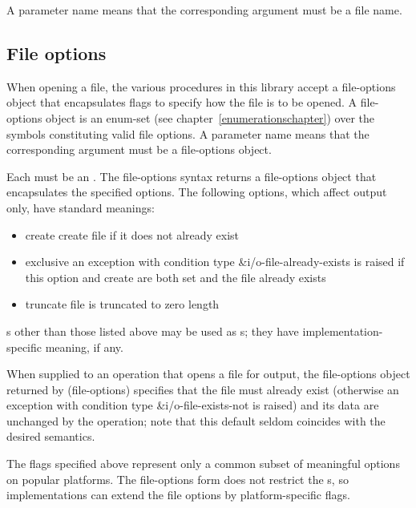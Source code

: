 A  parameter name means that the
corresponding argument must be a file name.

\subsection{File options}
\label{fileoptionssection}

When opening a file, the various procedures in this library accept a
{\cf file-options} object that encapsulates flags to specify how
the file is to be opened. A {\cf file-options} object is an enum-set
(see chapter~\ref{enumerationschapter}) over the symbols constituting
valid file options.
A  parameter name means that the
corresponding argument must be a file-options object.

\begin{entry}{%
}

Each  must be an .
The {\cf file-options} syntax returns a file-options object that 
encapsulates the
specified options. The following options, which affect output
only, have standard meanings:

\begin{itemize}   
\item {\cf create} create file if it does not already exist
\item {\cf exclusive} an exception with condition type
  {\cf\&i/o-file-already-exists} is raised if this
  option and {\cf create} are both set and the file already exists
\item {\cf truncate}
  file is truncated to zero length
\end{itemize}

s
other than those listed above may be used as s;
they have implementation-specific meaning, if any.

When supplied to an operation that opens a file for output,
the file-options object returned by {\cf (file-options)} specifies
that the file
must already exist (otherwise an exception with condition type
{\cf\&i/o-file-exists-not} is raised) and its data are unchanged by the
operation;
note that this default seldom coincides with the desired semantics.

\begin{rationale}
  The flags specified above represent only a common subset of
  meaningful options on popular platforms.  The {\cf file-options}
  form does not restrict the s, so 
  implementations can extend the file options by platform-specific
  flags.
\end{rationale}
\end{entry}   

